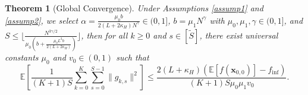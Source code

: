 \documentclass{article}
\newcommand{\bx}{\boldsymbol{x}}
\theoremstyle{plain}
\newtheorem{theorem}{Theorem}[section]
\theoremstyle{definition}
\theoremstyle{remark}
\begin{document}
\begin{theorem}[Global Convergence]\label{thm:Global Convergence}
Under Assumptions \ref{assump1} and \ref{assump2}, we select
$\alpha = \frac{\mu_0 b}{2(L+2\kappa_H)N^\gamma}\in(0,1]$, $b = \mu_1 N^{\gamma}$ with $\mu_0,\mu_1,\gamma \in(0,1]$, and $ S \leq \bigg\lfloor\frac{N^{3\gamma/2}}{\mu_0(b+\frac{\mu_0L^2b}{2(L+2\kappa_H)})}\bigg\rfloor$, then for all $k\geq 0$ and $s\in [\tilde{S}]$, there exist universal constants $\mu_0$ and $v_0 \in (0, 1)$ such that
\begin{equation*}
    \mathbb{E}\left[\frac{1}{(K+1)S}\sum_{k=0}^K\sum_{s=0}^{S-1}\|g_{k,s}\|^2\right] \leq \frac{2(L+\kappa_H)(\mathbb{E}[f(\bx_{0,0})] - f_{\inf})}{(K+1)S\mu_0\mu_1 v_0}.
\end{equation*}

\end{theorem}
\end{document}
